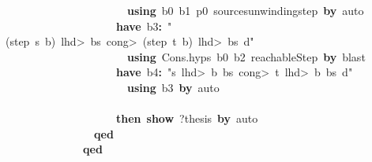 \documentclass{article}
\newcommand{\syntaxKEYWORDA}[1]{\textcolor[rgb]{0.0,0.4,0.6}{\textbf{#1}}}
\newcommand{\syntaxKEYWORDC}[1]{\textcolor[rgb]{0.0,0.6,1.0}{\textbf{#1}}}
\newcommand{\syntaxLITERALA}[1]{\textcolor[rgb]{1.0,0.0,0.8}{#1}}
\newcommand{\syntaxOPERATOR}[1]{\textcolor[rgb]{0.0,0.0,0.0}{\textbf{#1}}}
\newcommand{\syntaxKEYWORDA}[1]{\textcolor[rgb]{0.0,0.4,0.6}{\textbf{#1}}}
\newcommand{\syntaxKEYWORDC}[1]{\textcolor[rgb]{0.0,0.6,1.0}{\textbf{#1}}}
\newcommand{\syntaxLITERALA}[1]{\textcolor[rgb]{1.0,0.0,0.8}{#1}}
\newcommand{\syntaxOPERATOR}[1]{\textcolor[rgb]{0.0,0.0,0.0}{\textbf{#1}}}
\newcommand{\syntaxKEYWORDA}[1]{\textcolor[rgb]{0.0,0.4,0.6}{\textbf{#1}}}
\newcommand{\syntaxKEYWORDC}[1]{\textcolor[rgb]{0.0,0.6,1.0}{\textbf{#1}}}
\newcommand{\syntaxLITERALA}[1]{\textcolor[rgb]{1.0,0.0,0.8}{#1}}
\newcommand{\syntaxOPERATOR}[1]{\textcolor[rgb]{0.0,0.0,0.0}{\textbf{#1}}}
\newcommand{\syntaxKEYWORDA}[1]{\textcolor[rgb]{0.0,0.4,0.6}{#1}}
\newcommand{\syntaxKEYWORDC}[1]{\textcolor[rgb]{0.0,0.6,1.0}{#1}}
\newcommand{\syntaxLITERALA}[1]{\textcolor[rgb]{1.0,0.0,0.8}{\textbf{#1}}}
\newcommand{\syntaxOPERATOR}[1]{\textcolor[rgb]{0.0,0.0,0.0}{#1}}
\newcommand{\syntaxKEYWORDA}[1]{\textcolor[rgb]{0.0,0.4,0.6}{\textbf{#1}}}
\newcommand{\syntaxKEYWORDC}[1]{\textcolor[rgb]{0.0,0.6,1.0}{\textbf{#1}}}
\newcommand{\syntaxLITERALA}[1]{\textcolor[rgb]{1.0,0.0,0.8}{#1}}
\newcommand{\syntaxOPERATOR}[1]{\textcolor[rgb]{0.0,0.0,0.0}{\textbf{#1}}}
\newcommand{\syntaxKEYWORDA}[1]{\textcolor[rgb]{0.0,0.4,0.6}{\textbf{#1}}}
\newcommand{\syntaxKEYWORDC}[1]{\textcolor[rgb]{0.0,0.6,1.0}{\textbf{#1}}}
\newcommand{\syntaxLITERALA}[1]{\textcolor[rgb]{1.0,0.0,0.8}{#1}}
\newcommand{\syntaxOPERATOR}[1]{\textcolor[rgb]{0.0,0.0,0.0}{\textbf{#1}}}
\begin{document}
{\ }{\ }{\ }{\ }{\ }{\ }{\ }{\ }{\ }{\ }{\ }{\ }{\ }{\ }{\ }{\ }{\ }{\ }{\ }{\ }{\ }{\ }\syntaxKEYWORDA{using}{\ }b0{\ }b1{\ }p0{\ }sources\usebox{\underscorebox}unwinding\usebox{\underscorebox}step{\ }\syntaxKEYWORDA{by}{\ }auto\hspace*{\fill}\\
{\ }{\ }{\ }{\ }{\ }{\ }{\ }{\ }{\ }{\ }{\ }{\ }{\ }{\ }{\ }{\ }{\ }{\ }{\ }{\ }\syntaxKEYWORDA{have}{\ }b3\syntaxOPERATOR{:}{\ }\syntaxLITERALA{"(step{\ }s{\ }b){\ }\<lhd>{\ }bs{\ }\<cong>{\ }(step{\ }t{\ }b){\ }\<lhd>{\ }bs{\ }\usebox{\atbox}{\ }d"}\hspace*{\fill}\\
{\ }{\ }{\ }{\ }{\ }{\ }{\ }{\ }{\ }{\ }{\ }{\ }{\ }{\ }{\ }{\ }{\ }{\ }{\ }{\ }{\ }{\ }\syntaxKEYWORDA{using}{\ }Cons.hyps{\ }b0{\ }b2{\ }reachableStep{\ }\syntaxKEYWORDA{by}{\ }blast\hspace*{\fill}\\
{\ }{\ }{\ }{\ }{\ }{\ }{\ }{\ }{\ }{\ }{\ }{\ }{\ }{\ }{\ }{\ }{\ }{\ }{\ }{\ }\syntaxKEYWORDA{have}{\ }b4\syntaxOPERATOR{:}{\ }\syntaxLITERALA{"s{\ }\<lhd>{\ }b{\ }\usebox{\hashbox}{\ }bs{\ }\<cong>{\ }t{\ }\<lhd>{\ }b{\ }\usebox{\hashbox}{\ }bs{\ }\usebox{\atbox}{\ }d"}\hspace*{\fill}\\
{\ }{\ }{\ }{\ }{\ }{\ }{\ }{\ }{\ }{\ }{\ }{\ }{\ }{\ }{\ }{\ }{\ }{\ }{\ }{\ }{\ }{\ }\syntaxKEYWORDA{using}{\ }b3{\ }\syntaxKEYWORDA{by}{\ }auto\hspace*{\fill}\\
{\ }{\ }{\ }{\ }{\ }{\ }{\ }{\ }{\ }{\ }{\ }{\ }{\ }{\ }{\ }{\ }{\ }{\ }{\ }{\ }\syntaxKEYWORDA{\usebox{\closecurlybracket}}\hspace*{\fill}\\
{\ }{\ }{\ }{\ }{\ }{\ }{\ }{\ }{\ }{\ }{\ }{\ }{\ }{\ }{\ }{\ }{\ }{\ }{\ }{\ }\syntaxKEYWORDA{then}{\ }\syntaxKEYWORDC{show}{\ }?thesis{\ }\syntaxKEYWORDA{by}{\ }auto\hspace*{\fill}\\
{\ }{\ }{\ }{\ }{\ }{\ }{\ }{\ }{\ }{\ }{\ }{\ }{\ }{\ }{\ }{\ }\syntaxKEYWORDA{qed}\hspace*{\fill}\\
{\ }{\ }{\ }{\ }{\ }{\ }{\ }{\ }{\ }{\ }{\ }{\ }{\ }{\ }\syntaxKEYWORDA{qed}\hspace*{\fill}\\
{\ }{\ }{\ }{\ }{\ }{\ }{\ }{\ }{\ }{\ }{\ }{\ }\syntaxKEYWORDA{\usebox{\closecurlybracket}}\hspace*{\fill}\\
\end{document}
